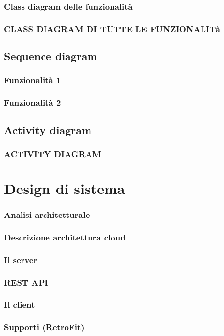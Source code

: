 \documentclass{article}
\begin{document}
			\subsubsection{Class diagram delle funzionalità}
			\subsubsection{CLASS DIAGRAM DI TUTTE LE FUNZIONALITà}
		\subsection{Sequence diagram}
			\subsubsection{Funzionalità 1}
			\subsubsection{Funzionalità 2}
		\subsection{Activity diagram}
			\subsubsection{ACTIVITY DIAGRAM}
	\section{Design di sistema}
		\subsubsection{Analisi architetturale}
		\subsubsection{Descrizione architettura cloud}
		\subsubsection{Il server}
		\subsubsection{REST API}
		\subsubsection{Il client}
		\subsubsection{Supporti (RetroFit)}
\end{document}
